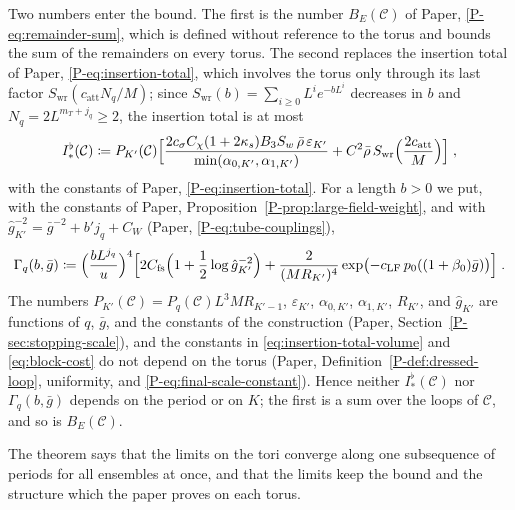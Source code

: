 \documentclass[11pt]{preprint}
\numberwithin{equation}{section}
\theoremstyle{definition}
\theoremstyle{remark}
\theoremstyle{plain}
\begin{document}
Two numbers enter the bound. The first is the number $B_E(\mathcal C)$ of Paper, \eqref{P-eq:remainder-sum}, which is defined without reference to the torus and bounds the sum of the remainders on every torus. The second replaces the insertion total of Paper, \eqref{P-eq:insertion-total}, which involves the torus only through its last factor $S_{\mathrm{wr}}(c_{\mathrm{att}}N_q/M)$; since $S_{\mathrm{wr}}(b) = \sum_{i \geq 0}L^ie^{-bL^i}$ decreases in $b$ and $N_q = 2L^{m_T+j_q} \geq 2$, the insertion total is at most
\begin{equation}\label{eq:insertion-total-volume}
    I^\flat_*(\mathcal C) \coloneqq P_{K'}(\mathcal C)\Bigl[\frac{2c_\sigma C_\chi(1 + 2\kappa_s)B_3S_w\,\bar\rho\,\varepsilon_{K'}}{\min(\alpha_{0,K'}, \alpha_{1,K'})} + C^2\bar\rho\,S_{\mathrm{wr}}\Bigl(\frac{2c_{\mathrm{att}}}{M}\Bigr)\Bigr]\;,
\end{equation}
with the constants of Paper, \eqref{P-eq:insertion-total}. For a length $b > 0$ we put, with the constants of Paper, Proposition~\ref{P-prop:large-field-weight}, and with $\hat g_{K'}^{-2} = \bar g^{-2} + b'j_q + C_W$ (Paper, \eqref{P-eq:tube-couplings}),
\begin{equation}\label{eq:block-cost}
    \Gamma_q(b, \bar g) \coloneqq \Bigl(\frac{bL^{j_q}}{u}\Bigr)^4\Bigl[2C_{\mathrm{fs}}\Bigl(1 + \frac12\log\hat g_{K'}^{-2}\Bigr) + \frac{2}{(MR_{K'})^4}\exp\bigl(-c_{\mathrm{LF}}\,p_0((1 + \beta_0)\bar g)\bigr)\Bigr]\;.
\end{equation}
The numbers $P_{K'}(\mathcal C) = P_q(\mathcal C)L^3MR_{K'-1}$, $\varepsilon_{K'}$, $\alpha_{0,K'}$, $\alpha_{1,K'}$, $R_{K'}$, and $\hat g_{K'}$ are functions of $q$, $\bar g$, and the constants of the construction (Paper, Section~\ref{P-sec:stopping-scale}), and the constants in \eqref{eq:insertion-total-volume} and \eqref{eq:block-cost} do not depend on the torus (Paper, Definition~\ref{P-def:dressed-loop}, uniformity, and \eqref{P-eq:final-scale-constant}). Hence neither $I^\flat_*(\mathcal C)$ nor $\Gamma_q(b, \bar g)$ depends on the period or on $K$; the first is a sum over the loops of $\mathcal C$, and so is $B_E(\mathcal C)$.

The theorem says that the limits on the tori converge along one subsequence of periods for all ensembles at once, and that the limits keep the bound and the structure which the paper proves on each torus.
\end{document}
